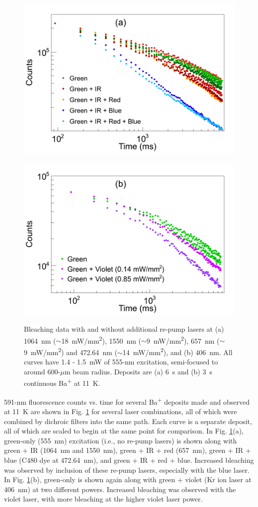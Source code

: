 \begin{figure} %
        \centering
                \includegraphics[width=.5\textwidth]{figures/bleach_re-pump_a.png}
                ~
                \includegraphics[width=.5\textwidth]{figures/bleach_re-pump_b.png}
                \caption{Bleaching data with and without additional re-pump lasers at (a) 1064~nm ($\sim$18~mW/mm\textsuperscript{2}), 1550~nm ($\sim$9~mW/mm\textsuperscript{2}), 657~nm ($\sim$9~mW/mm\textsuperscript{2}) and 472.64~nm ($\sim$14~mW/mm\textsuperscript{2}), and (b) 406~nm.  All curves have 1.4 - 1.5~mW of 555-nm excitation, semi-focused to around 600-$\mu$m beam radius.  Deposits are (a) 6~s and (b) 3~s continuous Ba\textsuperscript{+} at 11~K.}
\label{fig:bleach_repump}
\end{figure}

591-nm fluorescence counts vs. time for several Ba\textsuperscript{+} deposits made and observed at 11~K are shown in Fig. \ref{fig:bleach_repump} for several laser combinations, all of which were combined by dichroic filters into the same path.  Each curve is a separate deposit, all of which are scaled to begin at the same point for comparison.  In Fig. \ref{fig:bleach_repump}(a), green-only (555~nm) excitation (i.e., no re-pump lasers) is shown along with green + IR (1064~nm and 1550~nm), green + IR + red (657~nm), green + IR + blue (C480 dye at 472.64~nm), and green + IR + red + blue.  Increased bleaching was observed by inclusion of these re-pump lasers, especially with the blue laser.  In Fig. \ref{fig:bleach_repump}(b), green-only is shown again along with green + violet (Kr ion laser at 406~nm) at two different powers.  Increased bleaching was observed with the violet laser, with more bleaching at the higher violet laser power.

